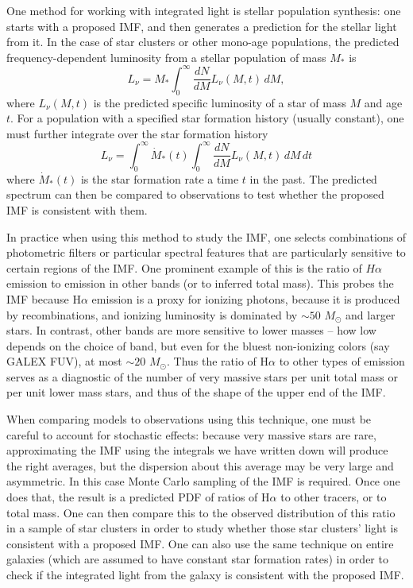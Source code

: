 One method for working with integrated light is stellar population synthesis: one starts with a proposed IMF, and then generates a prediction for the stellar light from it. In the case of star clusters or other mono-age populations, the predicted frequency-dependent luminosity from a stellar population of mass $M_*$ is
\begin{equation}
L_\nu = M_* \int_0^\infty \frac{dN}{dM} L_\nu(M,t) \, dM,
\end{equation}
where $L_\nu(M,t)$ is the predicted specific luminosity of a star of mass $M$ and age $t$. For a population with a specified star formation history (usually constant), one must further integrate over the star formation history
\begin{equation}
L_\nu = \int_0^{\infty} \dot{M}_*(t) \int_0^\infty \frac{dN}{dM} L_\nu(M,t) \, dM \, dt
\end{equation}
where $\dot{M}_*(t)$ is the star formation rate a time $t$ in the past. The predicted spectrum can then be compared to observations to test whether the proposed IMF is consistent with them.

In practice when using this method to study the IMF, one selects combinations of photometric filters or particular spectral features that are particularly sensitive to certain regions of the IMF. One prominent example of this is the ratio of $H\alpha$ emission to emission in other bands (or to inferred total mass). This probes the IMF because H$\alpha$ emission is a proxy for ionizing photons, because it is produced by recombinations, and ionizing luminosity is dominated by $\sim 50$ $M_\odot$ and larger stars. In contrast, other bands are more sensitive to lower masses -- how low depends on the choice of band, but even for the bluest non-ionizing colors (say GALEX FUV), at most $\sim 20$ $M_\odot$. Thus the ratio of H$\alpha$ to other types of emission serves as a diagnostic of the number of very massive stars per unit total mass or per unit lower mass stars, and thus of the shape of the upper end of the IMF.

When comparing models to observations using this technique, one must be careful to account for stochastic effects: because very massive stars are rare, approximating the IMF using the integrals we have written down will produce the right averages, but the dispersion about this average may be very large and asymmetric. In this case Monte Carlo sampling of the IMF is required. Once one does that, the result is a predicted PDF of ratios of H$\alpha$ to other tracers, or to total mass. One can then compare this to the observed distribution of this ratio in a sample of star clusters in order to study whether those star clusters' light is consistent with a proposed IMF. One can also use the same technique on entire galaxies (which are assumed to have constant star formation rates) in order to check if the integrated light from the galaxy is consistent with the proposed IMF.

